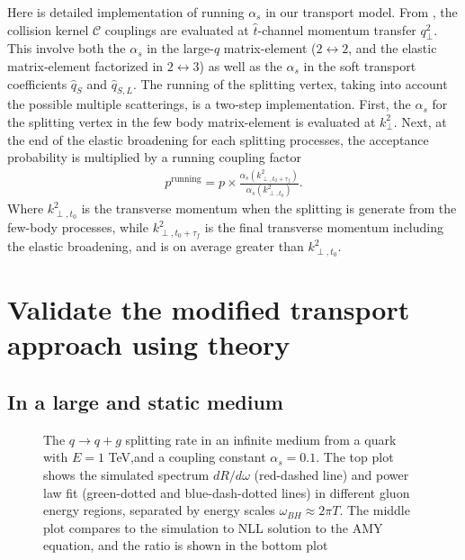 Here is detailed implementation of running $\alpha_s$ in our transport model. 
From \cite{Arnold:2008zu}, the collision kernel $\mathcal{C}$ couplings are evaluated at $\hat{t}$-channel momentum transfer $q_\perp^2$.
This involve both the $\alpha_s$ in the large-$q$ matrix-element ($2\leftrightarrow 2$, and the elastic matrix-element factorized in $2\leftrightarrow 3$) as well as the $\alpha_s$ in the soft transport coefficients $\hat{q}_S$ and $\hat{q}_{S, L}$.
The running of the splitting vertex, taking into account the possible multiple scatterings, is a two-step implementation. 
First, the $\alpha_s$ for the splitting vertex in the few body matrix-element is evaluated at $k_\perp^2$.
Next, at the end of the elastic broadening for each splitting processes, the acceptance probability is multiplied by a running coupling factor
\begin{eqnarray}
p^{\textrm{running}} = p\times \frac{\alpha_s(k_{\perp,t_0+\tau_f}^2)}{\alpha_s(k_{\perp,t_0}^2)}.
\end{eqnarray}
Where $k_{\perp,t_0}^2$ is the transverse momentum when the splitting is generate from the few-body processes, while $k_{\perp,t_0+\tau_f}^2$ is the final transverse momentum including the elastic broadening, and is on average greater than $k_{\perp,t_0}^2$.

\section{Validate the modified transport approach using theory}

\subsection{In a large and static medium}

\begin{figure}
\caption{The $q\rightarrow q+g$ splitting rate in an infinite medium from a quark with $E=1$ TeV,and a coupling constant $\alpha_s = 0.1$. The top plot shows the simulated spectrum $dR/d\omega$ (red-dashed line) and power law fit (green-dotted and blue-dash-dotted lines) in different gluon energy regions, separated by energy scales $\omega_{BH}\approx 2\pi T$. The middle plot compares to the simulation to NLL solution to the AMY equation, and the ratio is shown in the bottom plot}
\label{fig:spectrum}
\end{figure}


